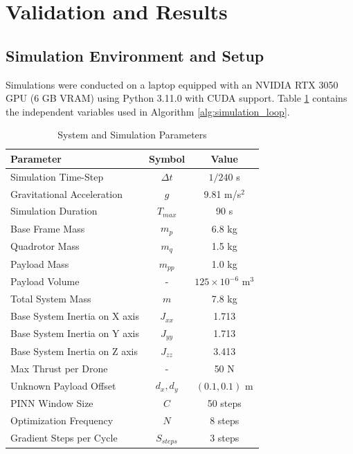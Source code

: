 \section{Validation and Results}

\subsection{Simulation Environment and Setup}

Simulations were conducted on a laptop equipped with an NVIDIA RTX 3050 GPU (6 GB VRAM) using Python 3.11.0 with CUDA support. Table \ref{tab:sim_parameters} contains the independent variables used in Algorithm \ref{alg:simulation_loop}.

\begin{table}[htbp]
    \centering
    \caption{System and Simulation Parameters}
    \label{tab:sim_parameters}
    \begin{tabular}{lcc}
        \hline
        \textbf{Parameter} & \textbf{Symbol} & \textbf{Value} \\
        \hline
        Simulation Time-Step & $\Delta t$ & $1/240$ s \\
        Gravitational Acceleration & $g$ & 9.81 m/s$^2$ \\
        Simulation Duration & $T_{max}$ & 90 s \\
        Base Frame Mass & $m_{p}$ & 6.8 kg \\
        Quadrotor Mass & $m_{q}$ & 1.5 kg \\
        Payload Mass & $m_{pp}$ & 1.0 kg \\
        Payload Volume & - & $125 \times 10^{-6}$ m$^3$ \\
        Total System Mass & $m$ & 7.8 kg \\
        Base System Inertia on X axis & $J_{xx}$ & 1.713 \\
        Base System Inertia on Y axis & $J_{yy}$ & 1.713 \\
        Base System Inertia on Z axis & $J_{zz}$ & 3.413 \\
        Max Thrust per Drone & - & 50 N \\
        Unknown Payload Offset & $d_x, d_y$ & $(0.1, 0.1)$ m \\
        PINN Window Size & $C$ & 50 steps \\
        Optimization Frequency & $N$ & 8 steps \\
        Gradient Steps per Cycle & $S_{steps}$ & 3 steps \\
        \hline
    \end{tabular}
\end{table}

